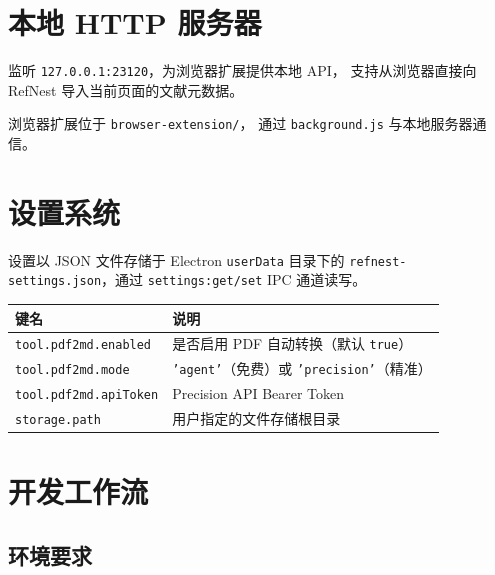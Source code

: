 \documentclass[12pt, a4paper]{article}
\begin{document}
\section{本地 HTTP 服务器}

监听 \texttt{127.0.0.1:23120}，为浏览器扩展提供本地 API，
支持从浏览器直接向 RefNest 导入当前页面的文献元数据。

浏览器扩展位于 \texttt{browser-extension/}，
通过 \texttt{background.js} 与本地服务器通信。

\section{设置系统}

设置以 JSON 文件存储于 Electron \texttt{userData} 目录下的
\texttt{refnest-settings.json}，通过 \texttt{settings:get/set} IPC 通道读写。

\begin{center}
\begin{tabular}{ll}
  \toprule
  \textbf{键名} & \textbf{说明} \\
  \midrule
  \texttt{tool.pdf2md.enabled}   & 是否启用 PDF 自动转换（默认 \texttt{true}） \\
  \texttt{tool.pdf2md.mode}      & \texttt{'agent'}（免费）或 \texttt{'precision'}（精准） \\
  \texttt{tool.pdf2md.apiToken}  & Precision API Bearer Token \\
  \texttt{storage.path}          & 用户指定的文件存储根目录 \\
  \bottomrule
\end{tabular}
\end{center}

\section{开发工作流}

\subsection{环境要求}
\end{document}
